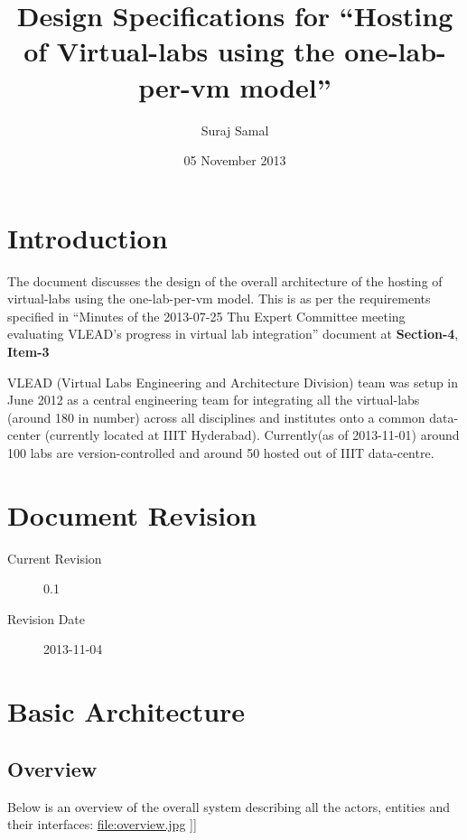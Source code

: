 \documentclass[11pt]{article}
\title{Design Specifications for ``Hosting of Virtual-labs using the one-lab-per-vm model''}
\author{Suraj Samal}
\date{05 November 2013}
\begin{document}
\maketitle

\setcounter{tocdepth}{3}
\tableofcontents
\vspace*{1cm}
\listoftables
\listoffigures

\section{Introduction}
\label{sec-1}


   The document discusses the design of the overall architecture of
   the hosting of virtual-labs using the one-lab-per-vm model. This is
   as per the requirements specified in ``Minutes of the 2013-07-25 Thu
   Expert Committee meeting evaluating VLEAD’s progress in virtual lab
   integration'' document at \textbf{Section-4}, \textbf{Item-3}

   VLEAD (Virtual Labs Engineering and Architecture Division) team was
   setup in June 2012 as a central engineering team for integrating
   all the virtual-labs (around 180 in number) across all disciplines
   and institutes onto a common data-center (currently located at IIIT
   Hyderabad). Currently(as of 2013-11-01) around 100 labs are
   version-controlled and around 50 hosted out of IIIT data-centre.

\section{Document Revision}
\label{sec-2}


\begin{description}
\item [Current Revision] 0.1
\item [Revision Date] 2013-11-04
\end{description}
\section{Basic Architecture}
\label{sec-3}

\subsection{Overview}
\label{sec-3.1}

   Below is an overview of the overall system describing all the
   actors, entities and their interfaces:
   \hyperref[[[file:overview.jpg]{file:overview.jpg} ]]
\end{document}
